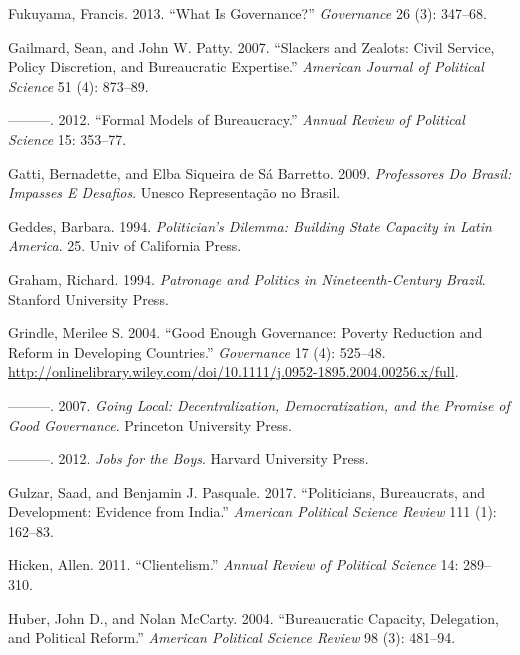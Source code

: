 \documentclass[12pt,]{article}
\begin{document}
\leavevmode\hypertarget{ref-fukuyama_what_2013}{}%
Fukuyama, Francis. 2013. ``What Is Governance?'' \emph{Governance} 26
(3): 347--68.

\leavevmode\hypertarget{ref-gailmard_slackers_2007}{}%
Gailmard, Sean, and John W. Patty. 2007. ``Slackers and Zealots: Civil
Service, Policy Discretion, and Bureaucratic Expertise.'' \emph{American
Journal of Political Science} 51 (4): 873--89.

\leavevmode\hypertarget{ref-gailmard_formal_2012}{}%
---------. 2012. ``Formal Models of Bureaucracy.'' \emph{Annual Review
of Political Science} 15: 353--77.

\leavevmode\hypertarget{ref-gatti_professores_2009}{}%
Gatti, Bernadette, and Elba Siqueira de Sá Barretto. 2009.
\emph{Professores Do Brasil: Impasses E Desafios}. Unesco Representação
no Brasil.

\leavevmode\hypertarget{ref-geddes_politicians_1994}{}%
Geddes, Barbara. 1994. \emph{Politician's Dilemma: Building State
Capacity in Latin America}. 25. Univ of California Press.

\leavevmode\hypertarget{ref-graham_patronage_1994}{}%
Graham, Richard. 1994. \emph{Patronage and Politics in
Nineteenth-Century Brazil}. Stanford University Press.

\leavevmode\hypertarget{ref-grindle_good_2004}{}%
Grindle, Merilee S. 2004. ``Good Enough Governance: Poverty Reduction
and Reform in Developing Countries.'' \emph{Governance} 17 (4): 525--48.
\url{http://onlinelibrary.wiley.com/doi/10.1111/j.0952-1895.2004.00256.x/full}.

\leavevmode\hypertarget{ref-grindle_going_2007}{}%
---------. 2007. \emph{Going Local: Decentralization, Democratization,
and the Promise of Good Governance}. Princeton University Press.

\leavevmode\hypertarget{ref-grindle_jobs_2012}{}%
---------. 2012. \emph{Jobs for the Boys}. Harvard University Press.

\leavevmode\hypertarget{ref-gulzar_politicians_2017}{}%
Gulzar, Saad, and Benjamin J. Pasquale. 2017. ``Politicians,
Bureaucrats, and Development: Evidence from India.'' \emph{American
Political Science Review} 111 (1): 162--83.

\leavevmode\hypertarget{ref-hicken_clientelism_2011}{}%
Hicken, Allen. 2011. ``Clientelism.'' \emph{Annual Review of Political
Science} 14: 289--310.

\leavevmode\hypertarget{ref-huber_bureaucratic_2004}{}%
Huber, John D., and Nolan McCarty. 2004. ``Bureaucratic Capacity,
Delegation, and Political Reform.'' \emph{American Political Science
Review} 98 (3): 481--94.
\end{document}
